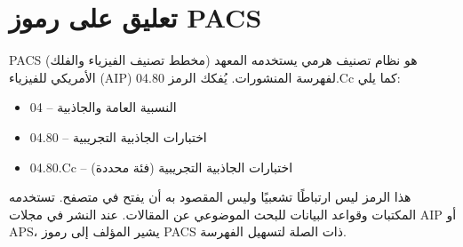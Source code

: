 \documentclass[11pt,a4paper]{article}
\begin{document}
	\section{تعليق على رموز PACS}
	\label{app:pacs}
	
	PACS (مخطط تصنيف الفيزياء والفلك) هو نظام تصنيف هرمي يستخدمه المعهد الأمريكي للفيزياء (AIP) لفهرسة المنشورات. يُفكك الرمز 04.80.Cc كما يلي:
	\begin{itemize}
		\item 04 – النسبية العامة والجاذبية
		\item 04.80 – اختبارات الجاذبية التجريبية
		\item 04.80.Cc – اختبارات الجاذبية التجريبية (فئة محددة)
	\end{itemize}
	هذا الرمز ليس ارتباطًا تشعبيًا وليس المقصود به أن يفتح في متصفح. تستخدمه المكتبات وقواعد البيانات للبحث الموضوعي عن المقالات. عند النشر في مجلات AIP أو APS، يشير المؤلف إلى رموز PACS ذات الصلة لتسهيل الفهرسة.
	
\end{document}
